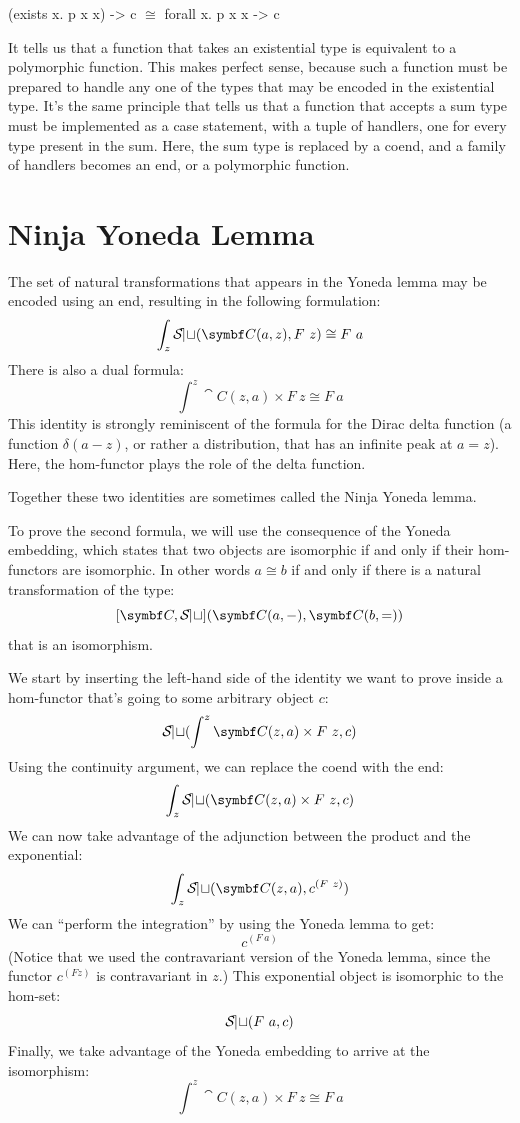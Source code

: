 \begin{snipv}
(exists x. p x x) -> c \ensuremath{\cong} forall x. p x x -> c
\end{snipv}
It tells us that a function that takes an existential type is equivalent
to a polymorphic function. This makes perfect sense, because such a
function must be prepared to handle any one of the types that may be
encoded in the existential type. It's the same principle that tells us
that a function that accepts a sum type must be implemented as a case
statement, with a tuple of handlers, one for every type present in the
sum. Here, the sum type is replaced by a coend, and a family of handlers
becomes an end, or a polymorphic function.

\section{Ninja Yoneda Lemma}

The set of natural transformations that appears in the Yoneda lemma may
be encoded using an end, resulting in the following formulation:
\[\int_z \Set(\cat{C}(a, z), F\ z) \cong F\ a\]
There is also a dual formula:
\[\int^z \cat{C}(z, a)\times{}F\ z \cong F\ a\]
This identity is strongly reminiscent of the formula for the Dirac delta
function (a function $\delta(a - z)$, or rather a distribution, that
has an infinite peak at $a = z$). Here, the hom-functor plays
the role of the delta function.

Together these two identities are sometimes called the Ninja Yoneda
lemma.

To prove the second formula, we will use the consequence of the Yoneda
embedding, which states that two objects are isomorphic if and only if
their hom-functors are isomorphic. In other words $a \cong b$ if
and only if there is a natural transformation of the type:
\[[\cat{C}, \Set](\cat{C}(a, -), \cat{C}(b, =))\]
that is an isomorphism.

We start by inserting the left-hand side of the identity we want to
prove inside a hom-functor that's going to some arbitrary object
$c$:
\[\Set(\int^z \cat{C}(z, a)\times{}F\ z, c)\]
Using the continuity argument, we can replace the coend with the end:
\[\int_z \Set(\cat{C}(z, a)\times{}F\ z, c)\]
We can now take advantage of the adjunction between the product and the
exponential:
\[\int_z \Set(\cat{C}(z, a), c^{(F\ z)})\]
We can ``perform the integration'' by using the Yoneda lemma to get:
\[c^{(F\ a)}\]
(Notice that we used the contravariant version of the Yoneda lemma, 
since the functor $c^{(F z)}$ is contravariant in $z$.)
This exponential object is isomorphic to the hom-set:
\[\mathcal{S\mkern-3mu et}(F\ a, c)\]
Finally, we take advantage of the Yoneda embedding to arrive at the
isomorphism:
\[\int^z \cat{C}(z, a)\times{}F\ z \cong F\ a\]

